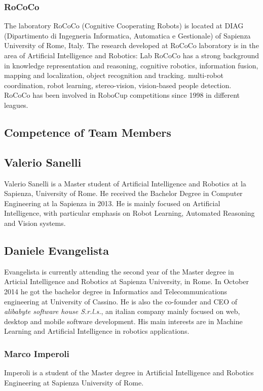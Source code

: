 \documentclass[conference]{IEEEtran}
\begin{document}
\subsubsection{RoCoCo} The laboratory RoCoCo (Cognitive Cooperating Robots) is located at DIAG (Dipartimento di Ingegneria Informatica, Automatica e Gestionale) of Sapienza University of Rome, Italy.
The research developed at RoCoCo laboratory is in the area of Artificial Intelligence and Robotics: Lab RoCoCo has a strong background in knowledge representation and reasoning, cognitive robotics, information fusion, mapping and localization, object recognition and tracking. multi-robot coordination, robot learning, stereo-vision, vision-based people detection. RoCoCo has been involved in RoboCup competitions since 1998 in different leagues.\\

\subsection{Competence of Team Members}
\subsection*{Valerio Sanelli}
Valerio Sanelli is a Master student of Artificial Intelligence and Robotics at la Sapienza, University of Rome.
He received the Bachelor Degree in Computer Engineering at la Sapienza in 2013.
He is mainly focused on Artificial Intelligence, with particular  emphasis on Robot Learning, Automated Reasoning and Vision systems.

\subsection*{Daniele Evangelista}
Evangelista is currently attending the second year of the Master degree in Articial Intelligence and Robotics at Sapienza University, in Rome. In October 2014 he got the bachelor degree in Informatics and Telecommunications engineering at University of Cassino. He is also the co-founder and CEO of \emph{alibabyte software house S.r.l.s.}, an italian company mainly focused on web, desktop and mobile software development. His main interests are in Machine Learning and Artificial Intelligence in robotics applications.
\subsubsection*{Marco Imperoli}
Imperoli is a student of the Master degree in Artificial Intelligence and Robotics Engineering at Sapienza University of Rome.
\end{document}
